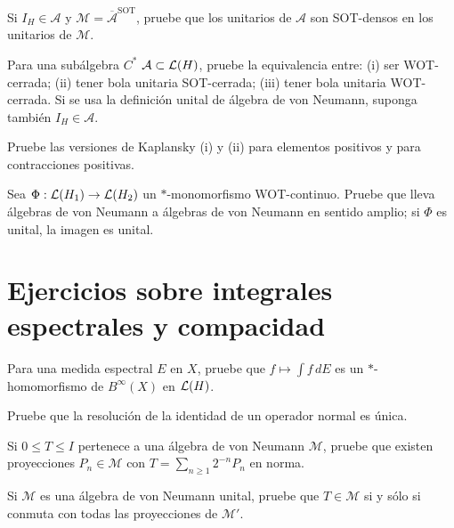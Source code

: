 \begin{ejercicio}\label{ej:v3-l33-2}
Si $I_H\in\mathcal A$ y $\mathcal M=\overline{\mathcal A}^{\mathrm{SOT}}$, pruebe que los unitarios de $\mathcal A$ son SOT-densos en los unitarios de $\mathcal M$.
\end{ejercicio}


\begin{ejercicio}\label{ej:v3-l33-3}
Para una subálgebra $C^*$ $\mathcal A\subset\mathcal L(H)$, pruebe la equivalencia entre: (i) ser WOT-cerrada; (ii) tener bola unitaria SOT-cerrada; (iii) tener bola unitaria WOT-cerrada. Si se usa la definición unital de álgebra de von Neumann, suponga también $I_H\in\mathcal A$.
\end{ejercicio}


\begin{ejercicio}\label{ej:v3-l33-4}
Pruebe las versiones de Kaplansky (i) y (ii) para elementos positivos y para contracciones positivas.
\end{ejercicio}


\begin{ejercicio}\label{ej:v3-l33-5}
Sea $\Phi:\mathcal L(H_1)\to\mathcal L(H_2)$ un $*$-monomorfismo WOT-continuo. Pruebe que lleva álgebras de von Neumann a álgebras de von Neumann en sentido amplio; si $\Phi$ es unital, la imagen es unital.
\end{ejercicio}


\section{Ejercicios sobre integrales espectrales y compacidad}

\begin{ejercicio}\label{ej:v3-l34-1}
Para una medida espectral $E$ en $X$, pruebe que $f\mapsto\int f\,dE$ es un $*$-homomorfismo de $B^\infty(X)$ en $\mathcal L(H)$.
\end{ejercicio}


\begin{ejercicio}\label{ej:v3-l34-2}
Pruebe que la resolución de la identidad de un operador normal es única.
\end{ejercicio}


\begin{ejercicio}\label{ej:v3-l34-3}
Si $0\le T\le I$ pertenece a una álgebra de von Neumann $\mathcal M$, pruebe que existen proyecciones $P_n\in\mathcal M$ con $T=\sum_{n\ge1}2^{-n}P_n$ en norma.
\end{ejercicio}


\begin{ejercicio}\label{ej:v3-l34-4}
Si $\mathcal M$ es una álgebra de von Neumann unital, pruebe que $T\in\mathcal M$ si y sólo si conmuta con todas las proyecciones de $\mathcal M'$.
\end{ejercicio}



